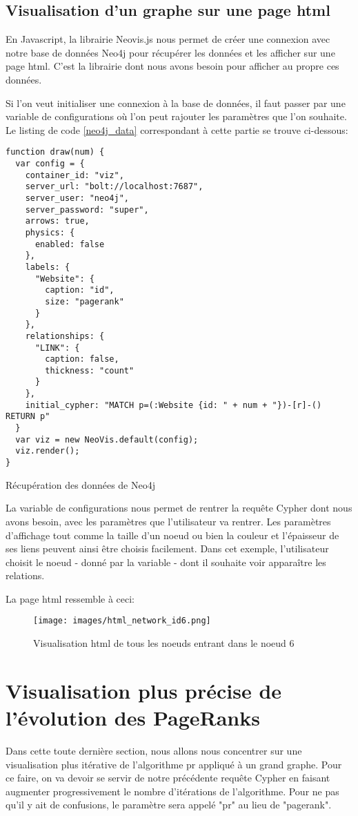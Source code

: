 \documentclass[12pt,twoside, openright]{memoir}
\newcommand{\courrier}[1]{{\fontfamily{qcr}\selectfont {#1}}}
\begin{document}
	\subsection{Visualisation d'un graphe sur une page \gls{html}}
	En Javascript, la librairie Neovis.js nous permet de créer une connexion avec notre base de données Neo4j pour récupérer les données et les afficher sur une page \gls{html}. C'est la librairie dont nous avons besoin pour afficher au propre ces données.\par
	Si l'on veut initialiser une connexion à la base de données, il faut passer par une variable de configurations où l'on peut rajouter les paramètres que l'on souhaite. Le listing de code \ref{neo4j_data} correspondant à cette partie se trouve ci-dessous:
	\begin{listing}
		\begin{verbatim}
function draw(num) {
  var config = {
    container_id: "viz",
    server_url: "bolt://localhost:7687",
    server_user: "neo4j",
    server_password: "super",
    arrows: true,
    physics: {
      enabled: false
    },
    labels: {
      "Website": {
        caption: "id",
        size: "pagerank"
      }
    },
    relationships: {
      "LINK": {
        caption: false,
        thickness: "count"
      }
    },
    initial_cypher: "MATCH p=(:Website {id: " + num + "})-[r]-() RETURN p"
  }
  var viz = new NeoVis.default(config);
  viz.render();
}
		\end{verbatim}
		\caption{Récupération des données de Neo4j}
		\label{neo4j_data}
	\end{listing}\newpage
	La variable de configurations \courrier{initial_cypher} nous permet de rentrer la requête Cypher dont nous avons besoin, avec les paramètres que l'utilisateur va rentrer. Les paramètres d'affichage tout comme la taille d'un noeud ou bien la couleur et l'épaisseur de ses liens peuvent ainsi être choisis facilement. Dans cet exemple, l'utilisateur choisit le noeud - donné par la variable \courrier{num} - dont il souhaite voir apparaître les relations.\par
	La page \gls{html} ressemble à ceci:
	\begin{figure}[!ht]
		\centering
		\texttt{[image: images/html\_network\_id6.png]}
		\caption{Visualisation \gls{html} de tous les noeuds entrant dans le noeud 6}
	\end{figure}
	\section{Visualisation plus précise de l'évolution des PageRanks}
	Dans cette toute dernière section, nous allons nous concentrer sur une visualisation plus itérative de l'algorithme \gls{pr} appliqué à un grand graphe. Pour ce faire, on va devoir se servir de notre précédente requête Cypher en faisant augmenter progressivement le nombre d'itérations de l'algorithme. Pour ne pas qu'il y ait de confusions, le paramètre \courrier{writeProperty} sera appelé "pr" au lieu de "pagerank".
\end{document}
